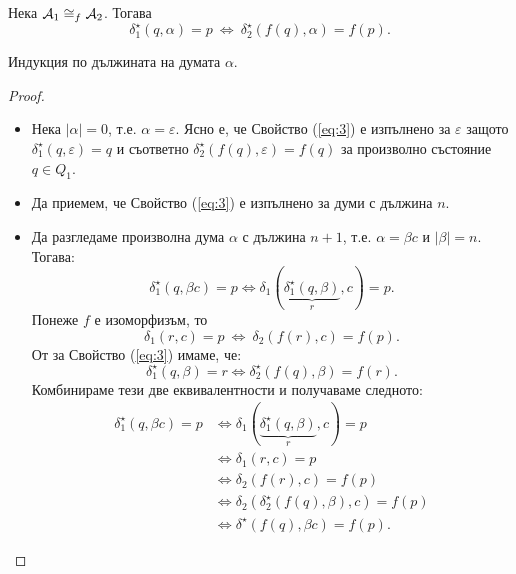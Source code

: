 \begin{proposition}
  Нека $\mathcal{A}_1 \cong_f \mathcal{A}_2$. Тогава
  \begin{equation}
    \label{eq:3}
    \delta^\star_1(q,\alpha) = p\ \iff\ \delta^\star_2(f(q), \alpha) = f(p).
  \end{equation}
\end{proposition}
\begin{hint}
  Индукция по дължината на думата $\alpha$.
\end{hint}
\begin{proof}
  \begin{itemize}
  \item 
    Нека $|\alpha| = 0$, т.е. $\alpha = \varepsilon$. Ясно е, че Свойство (\ref{eq:3})
    е изпълнено за $\varepsilon$ защото $\delta^\star_1(q,\varepsilon) = q$ и съответно
    $\delta^\star_2(f(q),\varepsilon) = f(q)$ за произволно състояние $q \in Q_1$.
  \item
    Да приемем, че Свойство (\ref{eq:3}) е изпълнено за думи с дължина $n$.
  \item
    Да разгледаме произволна дума $\alpha$ с дължина $n+1$, т.е. $\alpha = \beta c$ и $|\beta| = n$. Тогава:
    \[\delta^\star_1(q,\beta c) = p \iff \delta_1(\underbrace{\delta^\star_1(q,\beta)}_{r}, c) = p.\]
    Понеже $f$ е изоморфизъм, то
    \[\delta_1(r,c) = p\ \iff\ \delta_2(f(r),c) = f(p).\]
    От \IndHyp за Свойство (\ref{eq:3}) имаме, че:
    \[\delta^\star_1(q,\beta) = r \iff \delta^\star_2(f(q),\beta) = f(r).\]
    Комбинираме тези две еквивалентности и получаваме следното:
    \begin{align*}
      \delta^\star_1(q,\beta c) = p & \iff \delta_1(\underbrace{\delta^\star_1(q,\beta)}_{r}, c) = p\\
                                    & \iff \delta_1(r,c) = p\\
                                    & \iff \delta_2(f(r),c) = f(p)\\
                                    & \iff \delta_2(\delta^\star_2(f(q),\beta),c) = f(p)\\
                                    & \iff \delta^\star(f(q),\beta c) = f(p).
    \end{align*}
    

\end{itemize}
\end{proof}
